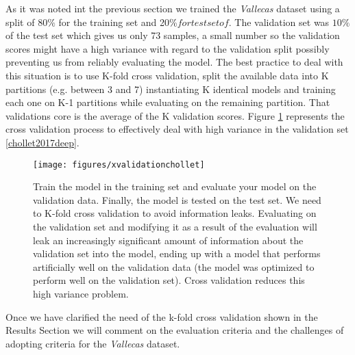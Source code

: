 \documentclass[11pt]{article}
\theoremstyle{definition}
\theoremstyle{remark}
\begin{document}
As it was noted int the previous section we trained the \emph{Vallecas} dataset using a split of $80\%$ for the training set and 20\%$ for test set of $. The validation set was $10\%$ of the test set which gives us only 73 samples, a small number so the validation scores might have a high variance with regard to the validation split possibly preventing us from reliably evaluating the model. The best practice to deal with this situation is to use K-fold cross validation, split the available data into K partitions (e.g. between 3 and 7) instantiating K identical models and training each one on K-1 partitions while evaluating on the remaining partition. That validations core is the average of the K validation scores. Figure \ref{fig:xvalchollet} represents the cross validation process to effectively deal with high variance in the validation set \ref{chollet2017deep}. 
\begin{figure}[H]
        \centering
        \texttt{[image: figures/xvalidationchollet]}
        \caption{Train the model in the training set and evaluate your model on the validation data. Finally, the model is tested on the test set. We need to K-fold cross validation to avoid information leaks. Evaluating on the validation set and modifying it as a result of the evaluation will leak an increasingly significant amount of information about the validation set into the model, ending up with a model that performs artificially well on the validation data (the model was optimized to perform well on the validation set). Cross validation reduces this high variance problem.} \label{fig:xvalchollet}
\end{figure}

Once we have clarified the need of the k-fold cross validation shown in the Results Section we will comment on the evaluation criteria and the challenges of adopting criteria for the \emph{Vallecas} dataset.
\end{document}
